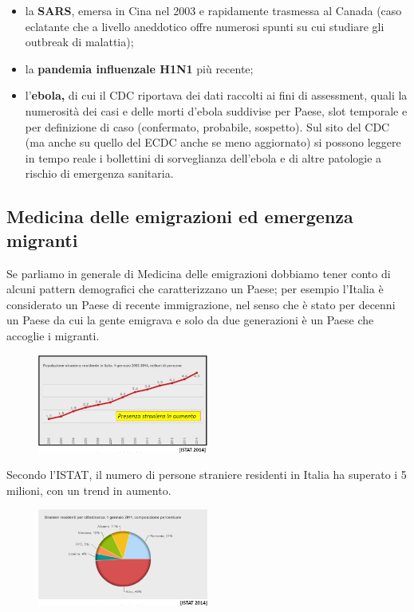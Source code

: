 \begin{itemize}
\item
  la \textbf{SARS}, emersa in Cina nel 2003 e rapidamente trasmessa al
  Canada (caso eclatante che a livello aneddotico offre numerosi spunti
  su cui studiare gli outbreak di malattia);
\item
  la \textbf{pandemia influenzale H1N1} più recente;
\item
  l'\textbf{ebola,} di cui il CDC riportava dei dati raccolti ai fini di
  assessment, quali la numerosità dei casi e delle morti d'ebola
  suddivise per Paese, slot temporale e per definizione di caso
  (confermato, probabile, sospetto). Sul sito del CDC (ma anche su
  quello del ECDC anche se meno aggiornato) si possono leggere in tempo
  reale i bollettini di sorveglianza dell'ebola e di altre patologie a
  rischio di emergenza sanitaria.
\end{itemize}

\subsection{Medicina delle emigrazioni ed emergenza migranti}

Se parliamo in generale di Medicina delle emigrazioni dobbiamo tener
conto di alcuni pattern demografici che caratterizzano un Paese; per
esempio l'Italia è considerato un Paese di recente immigrazione, nel
senso che è stato per decenni un Paese da cui la gente emigrava e solo
da due generazioni è un Paese che accoglie i migranti.

\begin{figure}[!ht]
\centering
	\includegraphics[width=0.5\textwidth]{26/image10.jpeg}
	\end{figure}

Secondo l'ISTAT, il numero di persone straniere residenti in Italia ha
superato i 5 milioni, con un trend in aumento.

\begin{figure}[!ht]
\centering
	\includegraphics[width=0.5\textwidth]{26/image11.jpeg}
	\end{figure}

